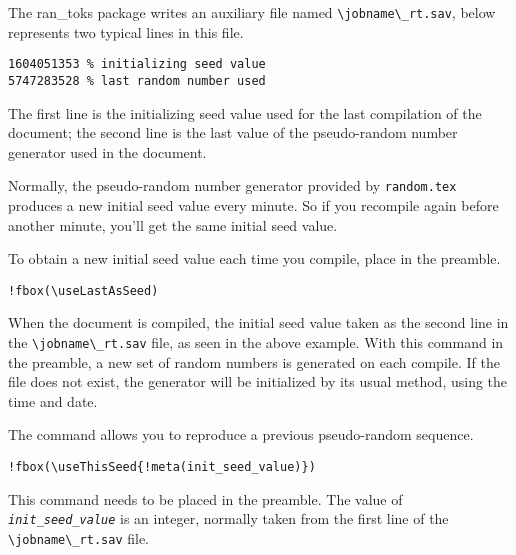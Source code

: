 \documentclass{article}
\def\meta#1{\textit{\texttt{#1}}}
\begin{document}
The \textsf{ran\_toks} package writes an auxiliary file named
\verb!\jobname\_rt.sav!, below represents two typical lines in this file.
\begin{Verbatim}[xleftmargin=20pt,commandchars=!()]
1604051353 % initializing seed value
5747283528 % last random number used
\end{Verbatim}
The first line is the initializing seed value used for the last
compilation of the document; the second line is the last value of the
pseudo-random number generator used in the document.

Normally, the pseudo-random number generator provided by
\texttt{random.tex} produces a new initial seed value every minute. So if
you recompile again before another minute, you'll get the same initial
seed value.

To obtain a new initial seed value each time you compile, place
 in the preamble.
\begin{Verbatim}[xleftmargin=20pt,commandchars=!()]
!fbox(\useLastAsSeed)
\end{Verbatim}
When the document is compiled, the initial seed value taken as the second
line in the \verb!\jobname\_rt.sav! file, as seen in the above example.
With this command in the preamble, a new set of random numbers is
generated on each compile. If the file  does not
exist, the generator will be initialized by its usual method, using the time and date.

The command  allows you to reproduce a previous
pseudo-random sequence.
\begin{Verbatim}[xleftmargin=20pt,commandchars=!()]
!fbox(\useThisSeed{!meta(init_seed_value)})
\end{Verbatim}
This command needs to be placed in the preamble. The value of
\meta{init\_seed\_value} is an integer, normally taken from the
first line of the \verb!\jobname\_rt.sav! file.
\end{document}
